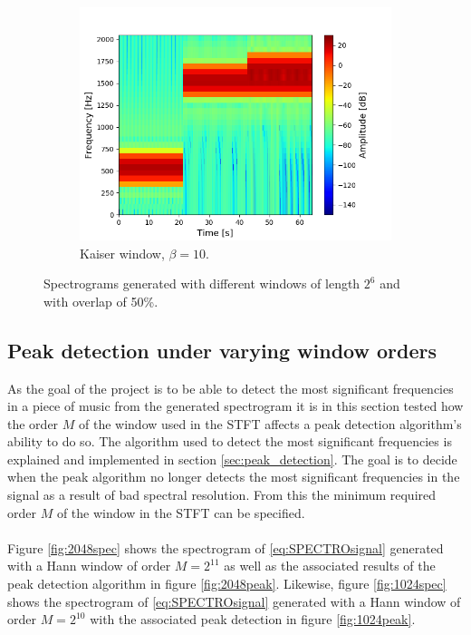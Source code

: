 \begin{figure}[H]
\begin{subfigure}{0.49\textwidth}
\includegraphics[width=\textwidth]{figures/stft_windows/100/kaiser_10.png}
\caption{Kaiser window, $\beta=10$.}
\label{fig:stft_kaiser_100_10}
\end{subfigure}
\caption{Spectrograms generated with different windows of length $2^6$ and with overlap of 50\%.}
\label{fig:stft_windows_100}
\end{figure}

\newpage
\subsection{Peak detection under varying window orders}
As the goal of the project is to be able to detect the most significant frequencies in a piece of music from the generated spectrogram it is in this section tested how the order $M$ of the window used in the STFT affects a peak detection algorithm's ability to do so. The algorithm used to detect the most significant frequencies is explained and implemented in section \ref{sec:peak_detection}. The goal is to decide when the peak algorithm no longer detects the most significant frequencies in the signal as a result of bad spectral resolution. From this the minimum required order $M$ of the window in the STFT can be specified.\\\\
Figure \ref{fig:2048spec} shows the spectrogram of \eqref{eq:SPECTROsignal} generated with a Hann window of order $M=2^{11}$ as well as the associated results of the peak detection algorithm in figure \ref{fig:2048peak}. Likewise, figure \ref{fig:1024spec} shows the spectrogram of \eqref{eq:SPECTROsignal} generated with a Hann window of order $M=2^{10}$ with the associated peak detection in figure \ref{fig:1024peak}.

